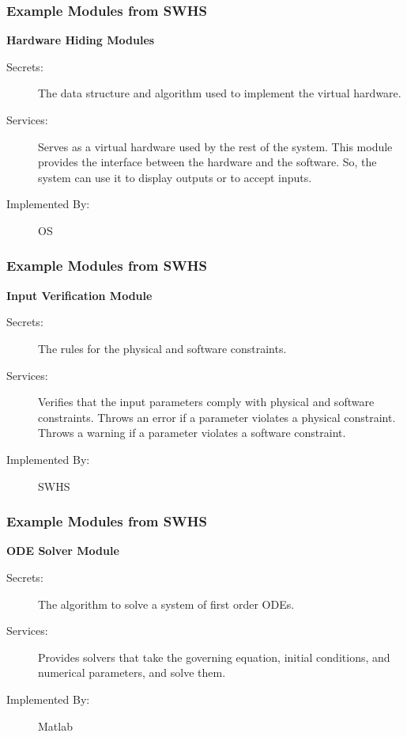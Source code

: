 \documentclass[t,12pt,numbers,fleqn]{beamer}
\begin{document}

\begin{frame}
\frametitle{Example Modules from SWHS}

\textbf{Hardware Hiding Modules}

\begin{description}
\item[Secrets:]The data structure and algorithm used to implement the virtual
  hardware.
\item[Services:]Serves as a virtual hardware used by the rest of the
  system. This module provides the interface between the hardware and the
  software. So, the system can use it to display outputs or to accept inputs.
\item[Implemented By:] OS
\end{description}

\end{frame}


\begin{frame}
\frametitle{Example Modules from SWHS}

\textbf{Input Verification Module}

\begin{description}
\item[Secrets:] The rules for the physical and software constraints.
\item[Services:] Verifies that the input parameters comply with physical and
  software constraints. Throws an error if a parameter violates a physical
  constraint. Throws a warning if a parameter violates a software constraint.
\item[Implemented By:] SWHS
\end{description}

\end{frame}


\begin{frame}
\frametitle{Example Modules from SWHS}

\textbf{ODE Solver Module}

\begin{description}
\item[Secrets:] The algorithm to solve a system of first order ODEs.
\item[Services:] Provides solvers that take the governing equation, initial
  conditions, and numerical parameters, and solve them.
\item[Implemented By:] Matlab
\end{description}

\end{frame}
\end{document}

